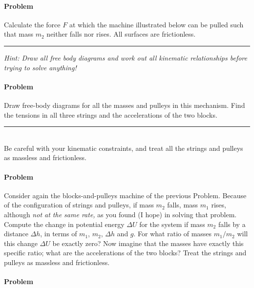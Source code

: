 \documentclass[12pt]{article}
\newcounter{problem}
\begin{document}
\paragraph{Problem~\theproblem}

Calculate the force $F$ at which the machine illustrated below can be
pulled such that mass $m_2$ neither falls nor rises.  All surfaces are
frictionless.
\\ \rule{0.2\textwidth}{0pt}

\emph{Hint: Draw all free body diagrams and work out all kinematic
relationships before trying to solve anything!}

\paragraph{Problem~\theproblem}

Draw free-body diagrams for all the masses and pulleys in this
mechanism.  Find the tensions in all three strings and the
accelerations of the two blocks.
\\ \rule{0.35\textwidth}{0pt}
\\
Be careful with your kinematic constraints, and treat all the
strings and pulleys as massless and frictionless.

\paragraph{Problem~\theproblem}

Consider again the blocks-and-pulleys machine of the previous Problem.
Because of the configuration of strings and pulleys, if mass $m_2$
falls, mass $m_1$ rises, although \emph{not at the same rate,} as you
found (I hope) in solving that problem.  Compute the change in
potential energy $\Delta U$ for the system if mass $m_2$ falls by a
distance $\Delta h$, in terms of $m_1$, $m_2$, $\Delta h$ and $g$.
For what ratio of masses $m_1/m_2$ will this change $\Delta U$ be
exactly zero?  Now imagine that the masses have exactly this specific
ratio; what are the accelerations of the two blocks?  Treat the
strings and pulleys as massless and frictionless.

\paragraph{Problem~\theproblem}
\end{document}
